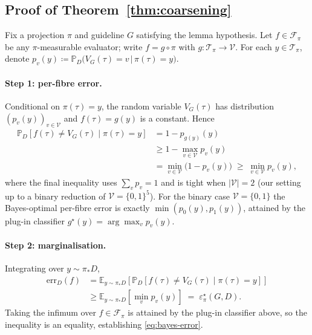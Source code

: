 \subsection{Proof of Theorem~\ref{thm:coarsening}}
\label{app:thm-main-proof}

Fix a projection $\pi$ and guideline $G$ satisfying the lemma
hypothesis. Let $f\in\mathcal{F}_\pi$ be any $\pi$-measurable evaluator; write
$f=g\circ\pi$ with $g:\mathcal{T}_\pi\to\mathcal{V}$. For each $y\in\mathcal{T}_\pi$,
denote $p_v(y)\coloneqq \mathbb{P}_D\bigl(V_G(\tau)=v\,\big|\,\pi(\tau)=y\bigr)$.

\paragraph{Step 1: per-fibre error.}
Conditional on $\pi(\tau)=y$, the random variable $V_G(\tau)$ has
distribution $(p_v(y))_{v\in\mathcal{V}}$ and $f(\tau)=g(y)$ is a constant.
Hence
\begin{align*}
\mathbb{P}_D\!\left[f(\tau)\neq V_G(\tau)\mid \pi(\tau)=y\right]
&= 1 - p_{g(y)}(y) \\
&\geq 1 - \max_{v\in\mathcal{V}} p_v(y) \\
&= \min_{v\in\mathcal{V}}\bigl(1-p_v(y)\bigr)
   \;\geq\; \min_{v\in\mathcal{V}} p_v(y),
\end{align*}
where the final inequality uses $\sum_v p_v=1$ and is tight when
$|\mathcal{V}|=2$ (our setting up to a binary reduction of $\mathcal{V}=\{0,1\}^5$).
For the binary case $\mathcal{V}=\{0,1\}$ the Bayes-optimal per-fibre error
is exactly $\min(p_0(y),p_1(y))$, attained by the plug-in classifier
$g^{\star}(y)=\arg\max_v p_v(y)$.

\paragraph{Step 2: marginalisation.}
Integrating over $y\sim\pi_\ast D$,
\begin{align*}
\text{err}_D(f)
  &= \mathbb{E}_{y\sim \pi_\ast D}\!\left[\mathbb{P}_D\!\left[f(\tau)\neq V_G(\tau)\mid \pi(\tau)=y\right]\right] \\
  &\geq \mathbb{E}_{y\sim \pi_\ast D}\!\left[\min_{v} p_v(y)\right]
  \;=\;\varepsilon^{\star}_{\pi}(G,D).
\end{align*}
Taking the infimum over $f\in\mathcal{F}_\pi$ is attained by the plug-in
classifier above, so the inequality is an equality, establishing
\eqref{eq:bayes-error}.

